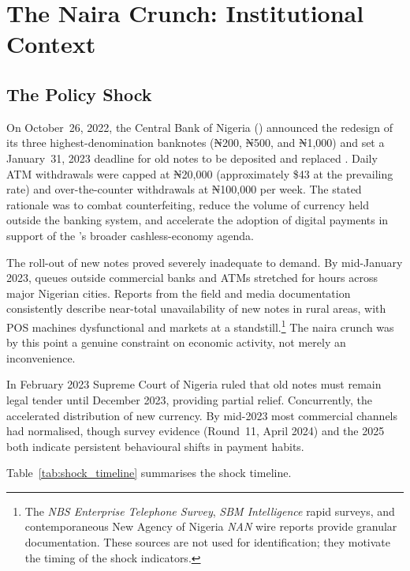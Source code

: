 
\section{The Naira Crunch: Institutional Context}
\label{sec:context}

\subsection{The Policy Shock}

On October~26, 2022, the Central Bank of Nigeria (\CBN) announced the
redesign of its three highest-denomination banknotes (₦200, ₦500, and
₦1,000) and set a January~31, 2023 deadline for old notes to be
deposited and replaced \citep{cbn2022circular}. Daily ATM withdrawals
were capped at ₦20,000 (approximately \$43 at the prevailing
rate) and over-the-counter withdrawals at ₦100,000 per week.
The stated rationale was to combat counterfeiting, reduce the volume
of currency held outside the banking system, and accelerate the
adoption of digital payments in support of the \CBN's broader
cashless-economy agenda.

The roll-out of new notes proved severely inadequate to demand. By
mid-January 2023, queues outside commercial banks and ATMs stretched
for hours across major Nigerian cities. Reports from the field and
media documentation consistently describe near-total unavailability
of new notes in rural areas, with POS machines dysfunctional and
markets at a standstill.\footnote{%
  The \emph{NBS Enterprise Telephone Survey}, \emph{SBM Intelligence}
  rapid surveys, and contemporaneous New Agency of Nigeria \emph{NAN} wire reports provide
  granular documentation. These sources are not used for
  identification; they motivate the timing of the shock indicators.}
The naira crunch was by this point a genuine constraint on economic
activity, not merely an inconvenience.

In February 2023 Supreme Court of Nigeria ruled that old notes must
remain legal tender until December 2023, providing partial relief.
Concurrently, the \CBN{} accelerated distribution of new currency.
By mid-2023 most commercial channels had normalised, though
\NLPS{} survey evidence (Round~11, April 2024) and the 2025 \WBES{}
both indicate persistent behavioural shifts in payment habits.

Table~\ref{tab:shock_timeline} summarises the shock timeline.

